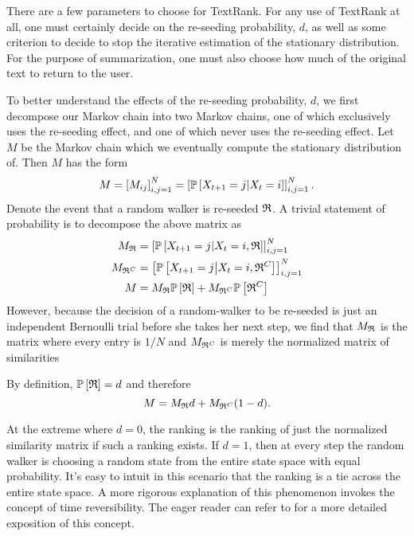 There are a few parameters to choose for TextRank.
For any use of TextRank at all, one must certainly decide on the re-seeding probability, $d$, as well as some criterion to decide to stop the iterative estimation of the stationary distribution.
For the purpose of summarization, one must also choose how much of the original text to return to the user.

To better understand the effects of the re-seeding probability, $d$, we first decompose our Markov chain into two Markov chains, one of which exclusively uses the re-seeding effect, and one of which never uses the re-seeding effect.
Let $M$ be the Markov chain which we eventually compute the stationary distribution of.
Then $M$ has the form
\begin{equation*}
  M = \left[ M_{ij} \right]_{i,j=1}^N = \left[ \mathbb{P} \left[ X_{t+1} = j \middle| X_t = i \right] \right]_{i,j=1}^N.
\end{equation*}
Denote the event that a random walker is re-seeded $\frak{R}$. 
A trivial statement of probability is to decompose the above matrix as
\begin{equation*}
  \begin{aligned}
    M_{\frak{R}} &= \left[ \mathbb{P} \left[ X_{t+1} = j \middle| X_t = i, \frak{R} \right] \right]_{i,j=1}^N \\
    M_{\frak{R}^C} &= \left[ \mathbb{P} \left[ X_{t+1} = j \middle| X_t = i, \frak{R}^C \right] \right]_{i,j=1}^N \\
    M &=  M_{\frak{R}} \mathbb{P} \left[ \frak{R} \right]  +  M_{\frak{R}^C} \mathbb{P} \left[ \frak{R}^C \right]     
  \end{aligned}
\end{equation*}
However, because the decision of a random-walker to be re-seeded is just an independent Bernoulli trial before she takes her next step, we find that $M_{\frak{R}}$ is the matrix where every entry is $1/N$ and $M_{\frak{R}^C}$ is merely the normalized matrix of similarities

By definition, $\mathbb{P} \left[ \frak{R} \right] = d$ and therefore
\begin{equation*}
  M =  M_{\frak{R}} d  +  M_{\frak{R}^C} (1-d).
\end{equation*}

At the extreme where $d=0$, the ranking is the ranking of just the normalized similarity matrix if such a ranking exists.
If $d=1$, then at every step the random walker is choosing a random state from the entire state space with equal probability.
It's easy to intuit in this scenario that the ranking is a tie across the entire state space.
A more rigorous explanation of this phenomenon invokes the concept of time reversibility. 
The eager reader can refer to \cite{intro-prob-models-ross} for a more detailed exposition of this concept.

